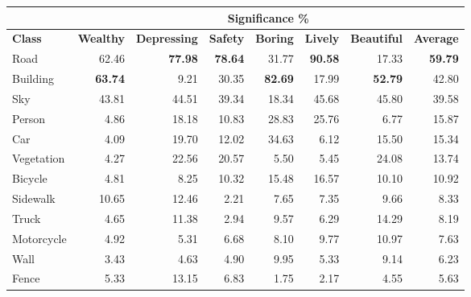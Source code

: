\begin{table}[H]
	\begin{tabular}{|l|rrrrrrr|}
		\hline
					& \multicolumn{7}{c|}{\textbf{Significance \%}}   \\ \hline
		\textbf{Class}         & \textbf{Wealthy}        & \textbf{Depressing}     & \textbf{Safety}         & \textbf{Boring}         & \textbf{Lively}         & \textbf{Beautiful}      & \textbf{Average}        \\
		\hline
		Road          & 62.46          & \textbf{77.98} & \textbf{78.64} & 31.77          & \textbf{90.58} & 17.33        & \textbf{59.79} \\
		Building      & \textbf{63.74} & 9.21           & 30.35          & \textbf{82.69} & 17.99          & \textbf{52.79} & 42.80          \\
		Sky           & 43.81          & 44.51          & 39.34          & 18.34          & 45.68          & 45.80          & 39.58          \\
		Person        & 4.86           & 18.18          & 10.83          & 28.83          & 25.76          & 6.77           & 15.87          \\
		Car           & 4.09           & 19.70          & 12.02          & 34.63          & 6.12           & 15.50          & 15.34          \\
		Vegetation    & 4.27           & 22.56          & 20.57          & 5.50           & 5.45           & 24.08          & 13.74          \\
		Bicycle       & 4.81           & 8.25           & 10.32          & 15.48          & 16.57          & 10.10          & 10.92          \\
		Sidewalk      & 10.65          & 12.46          & 2.21           & 7.65           & 7.35           & 9.66           & 8.33           \\
		Truck         & 4.65           & 11.38          & 2.94           & 9.57           & 6.29           & 14.29          & 8.19           \\
		Motorcycle    & 4.92           & 5.31           & 6.68           & 8.10           & 9.77           & 10.97          & 7.63           \\
		Wall          & 3.43           & 4.63           & 4.90           & 9.95           & 5.33           & 9.14           & 6.23           \\
		Fence         & 5.33           & 13.15          & 6.83           & 1.75           & 2.17           & 4.55           & 5.63           \\

\end{tabular}
\end{table}
